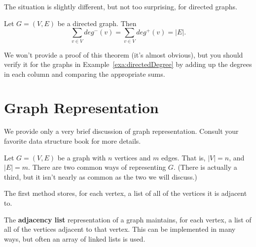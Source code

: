 The situation is slightly different, but not too surprising, for directed graphs.

\begin{thm}
Let $G=(V,E)$ be a directed graph.  Then
$$\sum_{v\in V} deg^{-}(v)=\sum_{v\in V} deg^{+}(v)=|E|.$$
\end{thm}


We won't provide a proof of this theorem (it's almost obvious), 
but you should verify it for the graphs in Example~\ref{exa:directedDegree} by
adding up the degrees in each column and comparing the appropriate sums.

\newpage

\section{Graph Representation}\label{sec:graphRep}

We provide only a very brief discussion of graph representation.  Consult your favorite data structure book for more details.

Let $G=(V,E)$ be a graph with $n$ vertices and $m$ edges. 
That is, $|V|=n$, and $|E|=m$.
There are two common ways of representing $G$. 
(There is actually a third, but it isn't nearly as common as the two we will discuss.)

The first method stores, for each vertex, a list of all of the vertices it is adjacent to.

\begin{df}
The {\bf adjacency list} representation of a graph maintains, for each vertex, 
a list of all of the vertices adjacent to that vertex.
This can be implemented in many ways, but often an array of linked lists is used.
\end{df}


